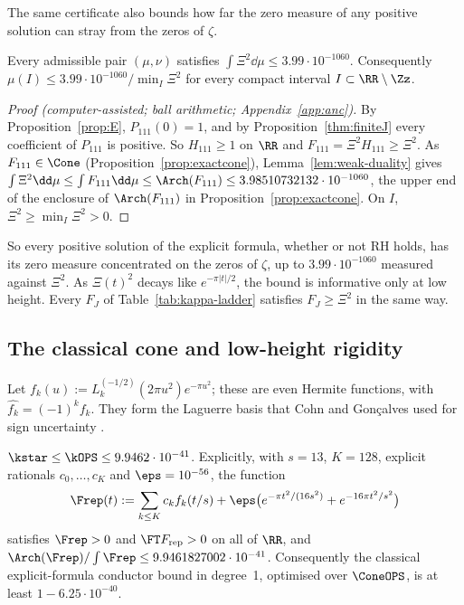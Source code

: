 The same certificate also bounds how far the zero measure of any positive solution can stray from the zeros of $\zeta$.

\begin{corollary}\label{cor:nearrigid}
Every admissible pair $(\mu,\nu)$ satisfies $\int\Xi^2\dd\mu\le3.99\cdot10^{-1060}$. Consequently $\mu(I)\le3.99\cdot10^{-1060}/\min_I\Xi^2$ for
every compact interval $I\subset\RR\setminus\Zz$.
\end{corollary}

\begin{proof}[Proof (computer-assisted; ball arithmetic; Appendix~\ref{app:anc})]
By Proposition~\ref{prop:E}, $P_{111}(0)=1$, and by Proposition~\ref{thm:finiteJ} every coefficient of $P_{111}$ is positive. So $H_{111}\ge1$ on $\RR$ and
$F_{111}=\Xi^2H_{111}\ge\Xi^2$. As $F_{111}\in\Cone$ (Proposition~\ref{prop:exactcone}), Lemma~\ref{lem:weak-duality} gives
$\int\Xi^2\dd\mu\le\int F_{111}\dd\mu\le\Arch(F_{111})\le3.98510732132\cdot10^{-1060}$, the upper end of the enclosure of
$\Arch(F_{111})$ in Proposition~\ref{prop:exactcone}. On $I$, $\Xi^2\ge\min_I\Xi^2>0$.
\end{proof}

So every positive solution of the explicit formula, whether or not RH holds, has its zero measure concentrated on the zeros of $\zeta$, up to
$3.99\cdot10^{-1060}$ measured against $\Xi^2$. As $\Xi(t)^2$ decays like $e^{-\pi|t|/2}$, the bound is informative only at low height.
Every $F_J$ of Table~\ref{tab:kappa-ladder} satisfies $F_J\ge\Xi^2$ in the same way.

\subsection{The classical cone and low-height rigidity}

Let $f_k(u):=L_k^{(-1/2)}(2\pi u^2)e^{-\pi u^2}$; these are even Hermite functions, with $\widehat{f_k}=(-1)^kf_k$. They form the Laguerre basis
that Cohn and Gon\c{c}alves used for sign uncertainty \cite{CG19}.

\begin{proposition}\label{thm:kappaOPS}
$\kstar\le\kOPS\le9.9462\cdot10^{-41}$. Explicitly, with $s=13$, $K=128$, explicit rationals $c_0,\dots,c_K$ and
$\eps=10^{-56}$, the function
\[
\Frep(t):=\sum_{k\le K}c_kf_k(t/s)+\eps\bigl(e^{-\pi t^2/(16s^2)}+e^{-16\pi t^2/s^2}\bigr)
\]
satisfies $\Frep>0$ and $\FT F_{\mathrm{rep}}>0$ on all of $\RR$, and $\Arch(\Frep)/\int\Frep\le9.9461827002\cdot10^{-41}$.
Consequently the classical explicit-formula conductor bound in degree~1, optimised over $\ConeOPS$, is at
least $1-6.25\cdot10^{-40}$.
\end{proposition}


